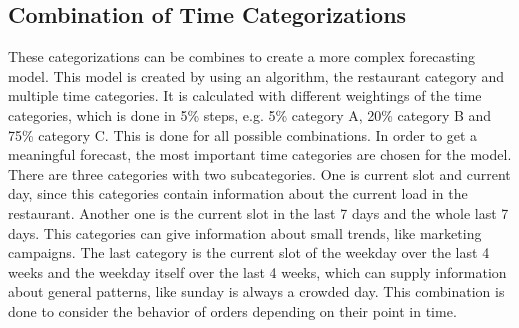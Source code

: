 \subsection{Combination of Time Categorizations}\label{subsection:Categorizing by Order}
These categorizations can be combines to create a more complex forecasting model. This model is created by using an algorithm, the restaurant category and multiple time categories. It is calculated with different weightings of the time categories, which is done in 5\% steps, e.g. 5\% category A, 20\% category B and 75\% category C. This is done for all possible combinations. In order to get a meaningful forecast, the most important time categories are chosen for the model. There are three categories with two subcategories. One is current slot and current day, since this categories contain information about the current load in the restaurant. Another one is the current slot in the last 7 days and the whole last 7 days. This categories can give information about small trends, like marketing campaigns. The last category is the current slot of the weekday over the last 4 weeks and the weekday itself over the last 4 weeks, which can supply information about general patterns, like sunday is always a crowded day.\newline
This combination is done to consider the behavior of orders depending on their point in time.
